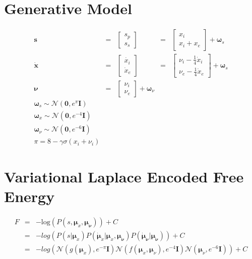 \documentclass[11pt]{article}
\begin{document}
\section*{Generative Model}
$$
\begin{array}{lllll}
    \mathbf{s} &=&  \left[\begin{array}{c} s_p \\ s_s\end{array}\right] &= &
    \left[\begin{array}{c} x_i \\ x_i + x_e \end{array}\right] +
    \bm{\omega}_s \\
    \mathbf{\dot{x}} &=&  \left[\begin{array}{c} \dot{x_i} \\ \dot{x}_e
    \end{array}\right]  &=& \left[\begin{array}{c} \nu_i -\frac{1}{4}
    \dot{x}_i\\ \nu_e -\frac{1}{4} \dot{x}_e\end{array}\right] + \bm{\omega}_s
    \\ \bm{\nu} &=& \left[\begin{array}{c} \nu_i \\ \nu_e \end{array}\right] +
    \bm{\omega}_{\nu}\\
    \bm{\omega}_s \sim \mathcal{N}(\mathbf{0}, e^{\pi} \mathbf{I})\\
    \bm{\omega}_x \sim \mathcal{N}(\mathbf{0}, e^{-4} \mathbf{I})\\
    \bm{\omega}_\nu \sim \mathcal{N}(\mathbf{0}, e^{-6} \mathbf{I})\\
    \pi = 8-\gamma\sigma(x_i + \nu_i)
\end{array}
$$

\section*{Variational Laplace Encoded Free Energy}

$$
    \begin{array}{lll}
        F &= &-\mathrm{log}(P(s,\bm{\mu}_x, \bm{\mu}_{\bm{\nu}} )) + C \\
          &= & -log( P(s|\bm{\mu}_x) P(\dot{\bm{\mu}}_{x}|\bm{\mu}_x,
          \bm{\mu}_{\bm{\nu}}) P(\dot{\bm{\mu}}_{\bm{\nu}}|\bm{\mu}_{\bm{\nu}}))
          + C  \\
        & = & -log( \mathcal{N}( g(\bm{\mu}_x),  e^{-\pi}\mathbf{I})
        \mathcal{N}( f(\bm{\mu}_x,\bm{\mu}_\nu), e^{-4}\mathbf{I})
        \mathcal{N}(\bm{\mu}_{\nu}, e^{-6}\mathbf{I}) ) + C  \\
    \end{array}
$$
\end{document}
